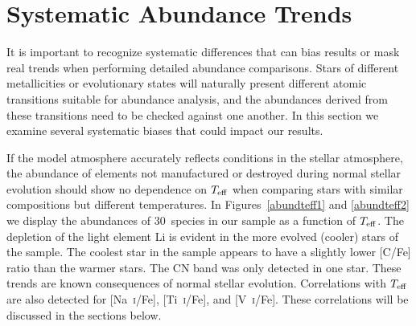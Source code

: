 \documentclass{emulateapj}
\begin{document}
\section{Systematic Abundance Trends}
\label{smallnumber}


It is important to recognize systematic differences that
can bias results or mask real trends when performing
detailed abundance comparisons.
Stars of different metallicities or evolutionary states
will naturally present different atomic transitions 
suitable for abundance analysis, and the abundances derived from
these transitions need to be checked against one another.
In this section we examine several systematic biases that 
could impact our results.

If the model atmosphere accurately reflects conditions in the
stellar atmosphere, the abundance of elements 
not manufactured or destroyed during normal stellar evolution
should show no dependence on $T_{\rm eff}$ when comparing 
stars with similar compositions but different temperatures.
In Figures~\ref{abundteff1} and \ref{abundteff2} we display 
the abundances of 30~species in our sample as a function of 
$T_{\rm eff}$.
The depletion of the light element Li is evident in the more
evolved (cooler) stars of the sample.
The coolest star in the sample appears to have a slightly lower
[C/Fe] ratio than the warmer stars.
The CN band was only detected in one star.
These trends are known consequences of normal stellar evolution.
Correlations with $T_{\rm eff}$ are also detected for 
[Na~\textsc{i}/Fe],
[Ti~\textsc{i}/Fe], and
[V~\textsc{i}/Fe].
These correlations will be discussed in the sections below.
\end{document}
